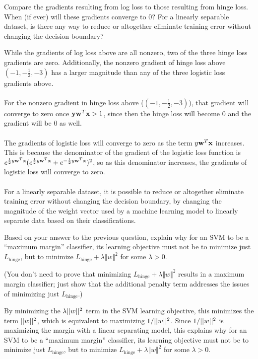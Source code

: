 \problem[4]
Compare the gradients resulting from log loss to those resulting from hinge loss. When (if ever) will these gradients converge to 0? For a linearly separable dataset, is there any way to reduce or altogether eliminate training error without changing the decision boundary?

While the gradients of log loss above are all nonzero, two of the three hinge loss gradients are zero. Additionally, the nonzero gradient of hinge loss above $(-1, -\frac{1}{2}, -3)$ has a larger magnitude than any of the three logistic loss gradients above.\\
\\
For the nonzero gradient in hinge loss above ($(-1, -\frac{1}{2}, -3)$), that gradient will converge to zero once $\mathbf{y}\mathbf{w}^T\mathbf{x} > 1$, since then the hinge loss will become 0 and the gradient will be 0 as well.\\
\\
The gradients of logistic loss will converge to zero as the term $y \mathbf{w} ^T \mathbf{x}$ increases. This is because the denominator of the gradient of the logistic loss function is $e^{\frac{1}{2} y \mathbf{w} ^T \mathbf{x}}(e^{\frac{1}{2} y \mathbf{w} ^T \mathbf{x}} + e^{-\frac{1}{2} y \mathbf{w} ^T \mathbf{x}})^2$, so as this denominator increases, the gradients of logistic loss will converge to zero.\\
\\
For a linearly separable dataset, it is possible to reduce or altogether eliminate training error without changing the decision boundary, by changing the magnitude of the weight vector used by a machine learning model to linearly separate data based on their classifications.

\problem[5]
Based on your answer to the previous question, explain why for an SVM to be a ``maximum margin'' classifier, its learning objective must not be to minimize just $L_\text{hinge}$, but to minimize $L_\text{hinge} + \lambda\Vert w \Vert^2$ for some $\lambda > 0$.

(You don't need to prove that minimizing $L_\text{hinge} + \lambda\Vert w \Vert^2$ results in a maximum margin classifier; just show that the additional penalty term addresses the issues of minimizing just $L_\text{hinge}$.)

By minimizing the $\lambda \vert \vert w \vert \vert^2$ term in the SVM learning objective, this minimizes the term $\vert \vert w \vert \vert^2$, which is equivalent to maximizing $1/\vert \vert w \vert \vert^2$. Since $1/\vert \vert w \vert \vert^2$ is maximizing the margin with a linear separating model, this explains why for an SVM to be a ``maximum margin'' classifier, its learning objective must not be to minimize just $L_\text{hinge}$, but to minimize $L_\text{hinge} + \lambda\Vert w \Vert^2$ for some $\lambda > 0$.

